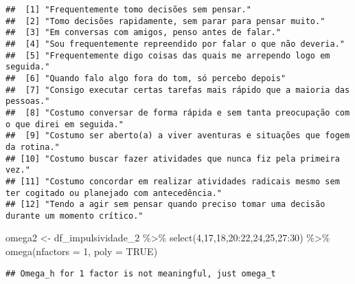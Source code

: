 \documentclass[
]{article}
\newenvironment{Shaded}{\begin{snugshade}}{\end{snugshade}}
\newcommand{\AttributeTok}[1]{\textcolor[rgb]{0.77,0.63,0.00}{#1}}
\newcommand{\ConstantTok}[1]{\textcolor[rgb]{0.00,0.00,0.00}{#1}}
\newcommand{\DecValTok}[1]{\textcolor[rgb]{0.00,0.00,0.81}{#1}}
\newcommand{\FunctionTok}[1]{\textcolor[rgb]{0.00,0.00,0.00}{#1}}
\newcommand{\NormalTok}[1]{#1}
\newcommand{\OtherTok}[1]{\textcolor[rgb]{0.56,0.35,0.01}{#1}}
\newcommand{\SpecialCharTok}[1]{\textcolor[rgb]{0.00,0.00,0.00}{#1}}
\begin{document}
\begin{verbatim}
##  [1] "Frequentemente tomo decisões sem pensar."                                                               
##  [2] "Tomo decisões rapidamente, sem parar para pensar muito."                                                
##  [3] "Em conversas com amigos, penso antes de falar."                                                         
##  [4] "Sou frequentemente repreendido por falar o que não deveria."                                            
##  [5] "Frequentemente digo coisas das quais me arrependo logo em seguida."                                     
##  [6] "Quando falo algo fora do tom, só percebo depois"                                                        
##  [7] "Consigo executar certas tarefas mais rápido que a maioria das pessoas."                                 
##  [8] "Costumo conversar de forma rápida e sem tanta preocupação com o que direi em seguida."                  
##  [9] "Costumo ser aberto(a) a viver aventuras e situações que fogem da rotina."                               
## [10] "Costumo buscar fazer atividades que nunca fiz pela primeira vez."                                       
## [11] "Costumo concordar em realizar atividades radicais mesmo sem ter cogitado ou planejado com antecedência."
## [12] "Tendo a agir sem pensar quando preciso tomar uma decisão durante um momento crítico."
\end{verbatim}

\begin{Shaded}
\begin{Highlighting}[]
\NormalTok{omega2 }\OtherTok{\textless{}{-}}\NormalTok{ df\_impulsividade\_2 }\SpecialCharTok{\%\textgreater{}\%} \FunctionTok{select}\NormalTok{(}\DecValTok{4}\NormalTok{,}\DecValTok{17}\NormalTok{,}\DecValTok{18}\NormalTok{,}\DecValTok{20}\SpecialCharTok{:}\DecValTok{22}\NormalTok{,}\DecValTok{24}\NormalTok{,}\DecValTok{25}\NormalTok{,}\DecValTok{27}\SpecialCharTok{:}\DecValTok{30}\NormalTok{) }\SpecialCharTok{\%\textgreater{}\%} \FunctionTok{omega}\NormalTok{(}\AttributeTok{nfactors =} \DecValTok{1}\NormalTok{, }\AttributeTok{poly =} \ConstantTok{TRUE}\NormalTok{)}
\end{Highlighting}
\end{Shaded}

\begin{verbatim}
## Omega_h for 1 factor is not meaningful, just omega_t
\end{verbatim}

\begin{Shaded}
\end{Shaded}
\end{document}
